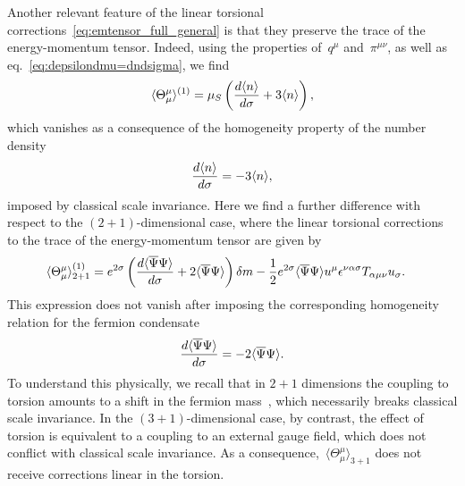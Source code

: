 \documentclass[11pt,a4paper]{article}
\begin{document}
Another relevant feature of the linear torsional 
corrections~\eqref{eq:emtensor_full_general} is that they
preserve the trace of the energy-momentum tensor. 
Indeed, using the properties of~$q^{\mu}$ and~$\pi^{\mu\nu}$, as 
well as eq.~\eqref{eq:depsilondmu=dndsigma}, we find
\begin{align}
\langle\Theta^{\mu}_{\mu}\rangle^{(1)}
=\mu_{S}\left({d\langle n\rangle\over d\sigma}
+3\langle n\rangle\right),
\end{align}
which vanishes as a consequence of the homogeneity property of the number density
\begin{align}
{d\langle n\rangle\over d\sigma}=-3\langle n\rangle,
\end{align} 
imposed by classical scale invariance. Here we find a further difference with respect to 
the $(2+1)$-dimensional case, where the linear torsional corrections to the trace of the energy-momentum tensor
are given by~\cite{Valle:2015hfa}
\begin{align}
\langle\Theta^{\mu}_{\mu}\rangle^{(1)}_{2+1}&=
e^{2\sigma}\left({d\langle\overline{\Psi}\Psi\rangle\over d\sigma}+2\langle\overline{\Psi}\Psi\rangle
\right)\delta m
-{1\over 2}e^{2\sigma}\langle\overline{\Psi}\Psi\rangle 
u^{\mu}\epsilon^{\nu\alpha\sigma}T_{\alpha\mu\nu}u_{\sigma}.
\label{eq:traceTheta2+1_pre}
\end{align}
This expression does not vanish after imposing the corresponding homogeneity relation for the fermion
condensate
\begin{align}
{d\langle\overline{\Psi}\Psi\rangle\over d\sigma}=-2\langle\overline{\Psi}\Psi\rangle.
\end{align} 
To understand this physically, we recall that 
in $2+1$ dimensions the coupling to
torsion amounts to a shift in the fermion mass~\cite{Valle:2015hfa}, 
which necessarily breaks classical scale invariance.
In the $(3+1)$-dimensional case, by contrast, the effect of 
torsion is equivalent to a coupling to an external
gauge field, which does not conflict with classical scale invariance. 
As a consequence,~$\langle \Theta^{\mu}_{\mu}\rangle_{3+1}$ does 
not receive corrections linear in the torsion.
\end{document}

